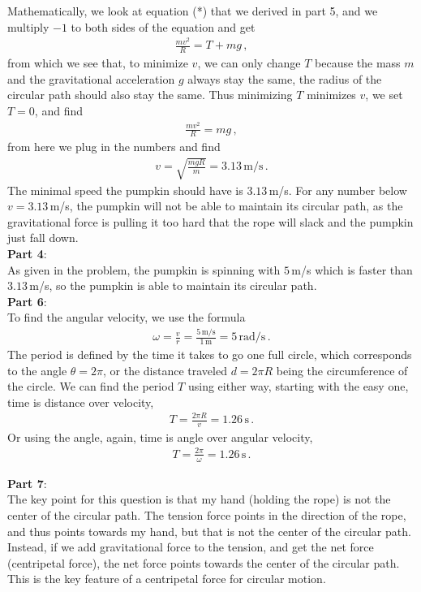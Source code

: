 \documentclass[11pt]{article}
\begin{document}
Mathematically, we look at equation (*) that we derived in part 5, and we multiply $-1$ to both sides of the equation and get
\begin{align*}
\frac{mv^2}{R} = T + mg\,,
\end{align*}
from which we see that, to minimize $v$, we can only change $T$ because the mass $m$ and the gravitational acceleration $g$ always stay the same, the radius of the circular path should also stay the same. Thus minimizing $T$ minimizes $v$, we set $T = 0$, and find
\begin{align*}
\frac{mv^2}{R} = mg\,,
\end{align*}
from here we plug in the numbers and find
\begin{align*}
v = \sqrt{\frac{mgR}{m}} = 3.13\,\text{m/s}\,.
\end{align*}
The minimal speed the pumpkin should have is $3.13\,$m/s. For any number below $v=3.13\,$m/s, the pumpkin will not be able to maintain its circular path, as the gravitational force is pulling it too hard that the rope will slack and the pumpkin just fall down. \\

\noindent\textbf{Part 4}:\\
As given in the problem, the pumpkin is spinning with $5\,$m/s which is faster than $3.13\,$m/s, so the pumpkin is able to maintain its circular path.\\

\noindent\textbf{Part 6}:\\
To find the angular velocity, we use the formula
\begin{align*}
\omega = \frac{v}{r} = \frac{5\,\text{m/s}}{1\,\text{m}} = 5\,\text{rad/s}\,.
\end{align*} 
The period is defined by the time it takes to go one full circle, which corresponds to the angle $\theta = 2\pi$, or the distance traveled $d = 2\pi R$ being the circumference of the circle. We can find the period $T$ using either way, starting with the easy one, time is distance over velocity,
\begin{align*}
T = \frac{2\pi R}{v} = 1.26\,\text{s}\,.
\end{align*}
Or using the angle, again, time is angle over angular velocity, 
\begin{align*}
T = \frac{2\pi}{\omega} = 1.26\,\text{s}\,.
\end{align*}


\noindent\textbf{Part 7}:\\
The key point for this question is that my hand (holding the rope) is not the center of the circular path. The tension force points in the direction of the rope, and thus points towards my hand, but that is not the center of the circular path. Instead, if we add gravitational force to the tension, and get the net force (centripetal force), the net force points towards the center of the circular path. This is the key feature of a centripetal force for circular motion. \\
\end{document}
